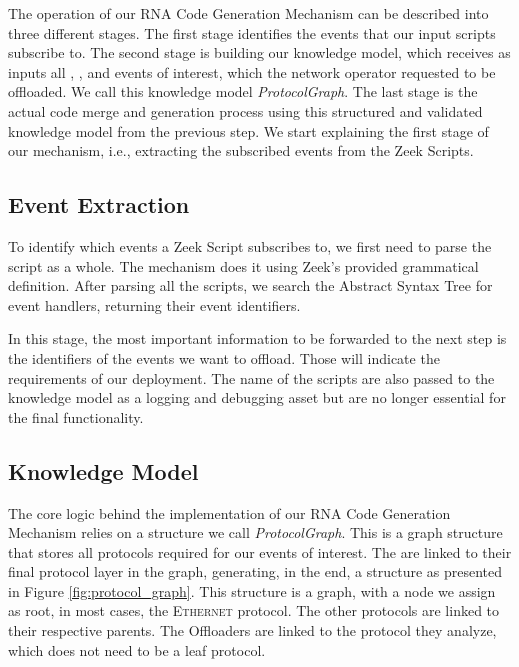 The operation of our RNA Code Generation Mechanism can be described into three different stages. The first stage identifies the events that our input scripts subscribe to. The second stage is building our knowledge model, which receives as inputs all \ProtocolTemplates{}, \Offloaders{}, and events of interest, which the network operator requested to be offloaded. We call this knowledge model \textit{ProtocolGraph}. The last stage is the actual code merge and generation process using this structured and validated knowledge model from the previous step. We start explaining the first stage of our mechanism, i.e., extracting the subscribed events from the Zeek Scripts.

\subsection{Event Extraction}

To identify which events a Zeek Script subscribes to, we first need to parse the script as a whole. The mechanism does it using Zeek's provided grammatical definition. After parsing all the scripts, we search the Abstract Syntax Tree for event handlers, returning their event identifiers.

In this stage, the most important information to be forwarded to the next step is the identifiers of the events we want to offload. Those will indicate the requirements of our deployment. The name of the scripts are also passed to the knowledge model as a logging and debugging asset but are no longer essential for the final functionality.

\subsection{Knowledge Model}

The core logic behind the implementation of our RNA Code Generation Mechanism relies on a structure we call \textit{ProtocolGraph}. This is a graph structure that stores all protocols required for our events of interest. The \Offloaders{} are linked to their final protocol layer in the graph, generating, in the end, a structure as presented in Figure \ref{fig:protocol_graph}. This structure is a graph, with a node we assign as root, in most cases, the \textsc{Ethernet} protocol. The other protocols are linked to their respective parents. The Offloaders are linked to the protocol they analyze, which does not need to be a leaf protocol.

